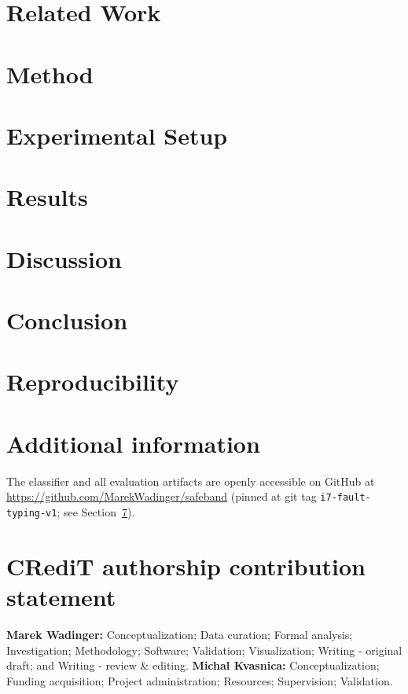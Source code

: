 \documentclass[preprint,12pt,authoryear]{elsarticle}
\begin{document}
\section{Related Work}
\label{Related Work}


\section{Method}
\label{Method}


\section{Experimental Setup}
\label{Experimental Setup}


\section{Results}
\label{Results}


\section{Discussion}
\label{Discussion}


\section{Conclusion}
\label{Conclusion}


\section{Reproducibility}
\label{Reproducibility}


\section*{Additional information}
The classifier and all evaluation artifacts are openly accessible on GitHub at \url{https://github.com/MarekWadinger/safeband} (pinned at git tag \texttt{i7-fault-typing-v1}; see Section~\ref{Reproducibility}).

\section*{CRediT authorship contribution statement}
\textbf{Marek Wadinger:} Conceptualization; Data curation; Formal analysis; Investigation; Methodology; Software; Validation; Visualization; Writing - original draft; and Writing - review \& editing. \textbf{Michal Kvasnica:} Conceptualization; Funding acquisition; Project administration; Resources; Supervision; Validation.
\end{document}
